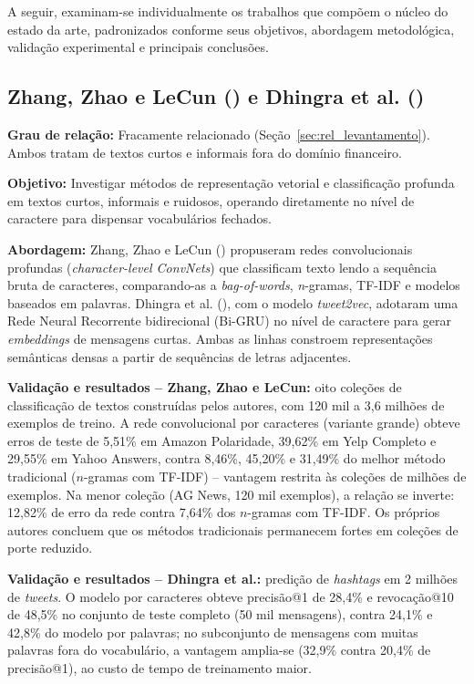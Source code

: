 A seguir, examinam-se individualmente os trabalhos que compõem o núcleo do estado da arte, padronizados conforme seus objetivos, abordagem metodológica, validação experimental e principais conclusões.

\subsection{Zhang, Zhao e LeCun (\citeyear{zhang2015character}) e Dhingra et al. (\citeyear{dhingra2016tweet2vec})}
\textbf{Grau de relação:} Fracamente relacionado (Seção~\ref{sec:rel_levantamento}). Ambos tratam de textos curtos e informais fora do domínio financeiro.

\textbf{Objetivo:} Investigar métodos de representação vetorial e classificação profunda em textos curtos, informais e ruidosos, operando diretamente no nível de caractere para dispensar vocabulários fechados.

\textbf{Abordagem:} Zhang, Zhao e LeCun (\citeyear{zhang2015character}) propuseram redes convolucionais profundas (\textit{character-level ConvNets}) que classificam texto lendo a sequência bruta de caracteres, comparando-as a \textit{bag-of-words}, \textit{n}-gramas, TF-IDF e modelos baseados em palavras. Dhingra et al. (\citeyear{dhingra2016tweet2vec}), com o modelo \textit{tweet2vec}, adotaram uma Rede Neural Recorrente bidirecional (Bi-GRU) no nível de caractere para gerar \textit{embeddings} de mensagens curtas. Ambas as linhas constroem representações semânticas densas a partir de sequências de letras adjacentes.

\textbf{Validação e resultados -- Zhang, Zhao e LeCun:} oito coleções de classificação de textos construídas pelos autores, com 120 mil a 3,6 milhões de exemplos de treino. A rede convolucional por caracteres (variante grande) obteve erros de teste de 5,51\% em Amazon Polaridade, 39,62\% em Yelp Completo e 29,55\% em Yahoo Answers, contra 8,46\%, 45,20\% e 31,49\% do melhor método tradicional ($n$-gramas com TF-IDF) -- vantagem restrita às coleções de milhões de exemplos. Na menor coleção (AG News, 120 mil exemplos), a relação se inverte: 12,82\% de erro da rede contra 7,64\% dos $n$-gramas com TF-IDF. Os próprios autores concluem que os métodos tradicionais permanecem fortes em coleções de porte reduzido.

\textbf{Validação e resultados -- Dhingra et al.:} predição de \textit{hashtags} em 2 milhões de \textit{tweets}. O modelo por caracteres obteve precisão@1 de 28,4\% e revocação@10 de 48,5\% no conjunto de teste completo (50 mil mensagens), contra 24,1\% e 42,8\% do modelo por palavras; no subconjunto de mensagens com muitas palavras fora do vocabulário, a vantagem amplia-se (32,9\% contra 20,4\% de precisão@1), ao custo de tempo de treinamento maior.

